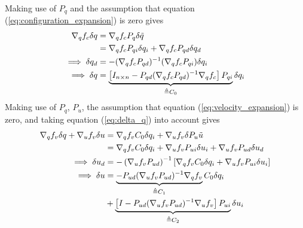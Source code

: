 Making use of $P_q$ and the assumption that equation
(\ref{eq:configuration_expansion}) is zero gives
\begin{align}
\nabla_{q}f_{c} \delta q &= \nabla_{q}f_{c} P_{q} \delta \tilde{q} \notag \\
   &= \nabla_{q}f_{c} P_{qi} \delta q_i +
  \nabla_{q}f_{c} P_{qd} \delta q_d\notag\\
  \implies \delta q_d &= -(\nabla_{q}f_{c} P_{qd})^{-1}
  (\nabla_{q}f_{c} P_{qi}) \delta q_i \notag\\
  \label{eq:delta_q}
  \implies \delta q &= \underbrace{\left[ I_{n \times n} - P_{qd}(\nabla_{q}
  f_{c} P_{qd})^{-1} \nabla_{q} f_{c} \right]
  P_{qi}}_{\triangleq C_0} \delta q_i
\end{align}
Making use of $P_q$, $P_u$, the assumption that equation
(\ref{eq:velocity_expansion}) is zero, and taking equation (\ref{eq:delta_q})
into account gives
\begin{align}
\nabla_{q}f_{v} \delta q + \nabla_{u}f_{v} \delta u
  &= \nabla_{q} f_{v} C_0 \delta q_i +\nabla_{u} f_{v}
  \delta P_u \tilde{u} \notag \\
  &=\nabla_{q} f_{v} C_0 \delta q_i + \nabla_{u} f_{v} P_{ui} \delta u_i +
\nabla_{u} f_{v} P_{ud} \delta u_d \notag\\
%
\implies \delta u_d &= -\left(\nabla_{u} f_{v}
P_{ud}\right)^{-1}\left[\nabla_{q}f_{v} C_0 \delta q_i +
  \nabla_{u} f_{v} P_{ui} \delta u_i \right]\notag\\
  \implies \delta u &= \underbrace{-P_{ud}(\nabla_{u} f_{v} P_{ud})^{-1}
  \nabla_{q} f_{v}}_{\triangleq C_1} C_0 \delta q_i \notag\\
  \label{eq:delta_u}
  &+ \underbrace{\left[I - P_{ud} (\nabla_{u}f_{v} P_{ud})^{-1} \nabla_{u}
  f_{v} \right] P_{ui}}_{\triangleq C_2} \delta u_i
\end{align}

